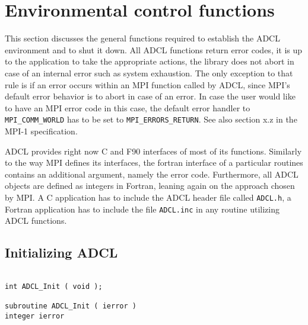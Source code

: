\section{Environmental control functions}

This section discusses the general functions required to establish the ADCL environment and to shut it down.
All ADCL functions return error codes, it is up to the application to take the appropriate actions, the library does not abort in case of an internal error such as system exhaustion. The only exception to that rule is if an error occurs within an MPI function called by ADCL, since MPI's default error behavior is to abort in case of an error. In case the user would like to have an MPI error code in this case, the default error handler to {\tt MPI\_COMM\_WORLD} has to be set to {\tt MPI\_ERRORS\_RETURN}. See also section x.z in the MPI-1 specification.

ADCL provides right now C and F90 interfaces of most of its functions. Similarly to the way MPI defines its interfaces, the fortran interface of a particular routines contains an additional argument, namely the error code. Furthermore, all ADCL objects are defined as integers in Fortran, leaning again on the approach chosen by MPI. A C application has to include the ADCL header file called {\tt ADCL.h}, a Fortran application has to include the file {\tt ADCL.inc} in any routine utilizing ADCL functions.

\subsection{Initializing ADCL}
\begin{verbatim}

int ADCL_Init ( void );

subroutine ADCL_Init ( ierror )
integer ierror

\end{verbatim}

